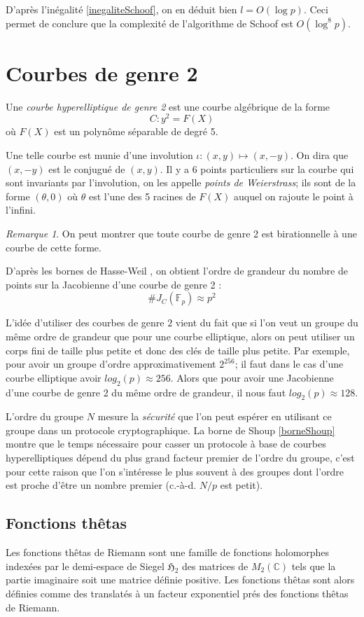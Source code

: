 \documentclass[a4paper]{article}
\theoremstyle{definition}
\theoremstyle{remark}
\newtheorem{remarque}{Remarque}
\numberwithin{equation}{section}
\begin{document}
D'après l'inégalité \ref{inegaliteSchoof}, on en déduit bien $l = O(\log p)$. Ceci permet de conclure que la complexité de l'algorithme de Schoof est $O(\log^8 p)$.

\section{Courbes de genre 2}
Une \emph{courbe hyperelliptique de genre 2} est une courbe algébrique de la forme
$$C : y^2 = F(X)$$
où $F(X)$ est un polynôme séparable de degré 5.

Une telle courbe est munie d'une involution $\iota : (x,y) \longmapsto (x,-y)$. On dira que $(x,-y)$ est le conjugué de $(x,y)$. Il y a 6 points particuliers sur la courbe qui sont invariants par l'involution, on les appelle \emph{points de Weierstrass}; ils sont de la forme $(\theta,0)$ où $\theta$ est l'une des 5 racines de $F(X)$ auquel on rajoute le point à l'infini.

\begin{remarque}
On peut montrer que toute courbe de genre 2 est birationnelle à une courbe de cette forme.
\end{remarque}

D'après les bornes de Hasse-Weil \cite{weil}, on obtient l'ordre de grandeur du nombre de points sur la Jacobienne d'une courbe de genre 2 :
$$\#J_C(\mathbb{F}_p) \approx p^2$$

L'idée d'utiliser des courbes de genre $2$ vient du fait que si l'on veut un groupe du même ordre de grandeur que pour une courbe elliptique, alors on peut utiliser un corps fini de taille plus petite et donc des clés de taille plus petite. Par exemple, pour avoir un groupe d'ordre approximativement $2^{256}$; il faut dans le cas d'une courbe elliptique avoir $log_2(p) \approx 256$. Alors que pour avoir une Jacobienne d'une courbe de genre 2 du même ordre de grandeur, il nous faut $log_2(p) \approx 128$.

L'ordre du groupe $N$ mesure la \emph{sécurité} que l'on peut espérer en utilisant ce groupe dans un protocole cryptographique. La borne de Shoup \ref{borneShoup} montre que le temps nécessaire pour casser un protocole à base de courbes hyperelliptiques dépend du plus grand facteur premier de l'ordre du groupe, c'est pour cette raison que l'on s'intéresse le plus souvent à des groupes dont l'ordre est proche d'être un nombre premier (c.-à-d. $N/p$ est petit).

\subsection{Fonctions thêtas}
Les fonctions thêtas de Riemann sont une famille de fonctions holomorphes indexées par le demi-espace de Siegel $\mathfrak{H}_2$ des matrices de $M_2(\mathbb{C})$ tels que la partie imaginaire soit une matrice définie positive. Les fonctions thêtas sont alors définies comme des translatés à un facteur exponentiel prés des fonctions thêtas de Riemann.
\end{document}
